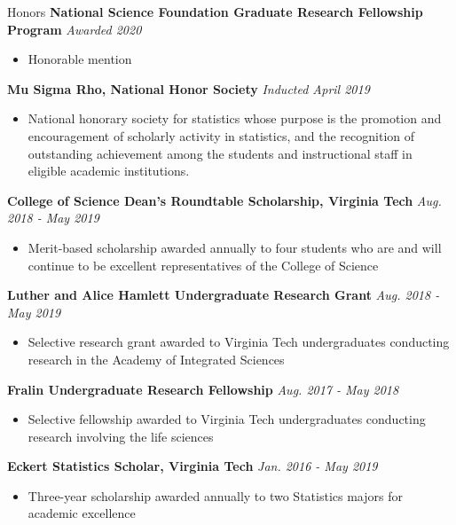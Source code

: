 \documentclass{resume} %
\begin{document}
\newpage

\begin{rSection}{Honors}
{\bf National Science Foundation Graduate Research Fellowship Program} \hfill { \em Awarded 2020}
\begin{itemize}
    \item Honorable mention
\end{itemize}

{\bf Mu Sigma Rho, National Honor Society} \hfill { \em Inducted April 2019}
\begin{itemize}
    \item National honorary society for statistics whose purpose is the promotion and encouragement of scholarly activity in statistics, and the recognition of outstanding achievement among the students and instructional staff in eligible academic institutions.
\end{itemize}

{\bf College of Science Dean’s Roundtable Scholarship, Virginia Tech} \hfill { \em Aug. 2018 - May 2019}
\begin{itemize}
    \item Merit-based scholarship awarded annually to four students who are and will continue to be excellent representatives of the College of Science
\end{itemize}

{\bf Luther and Alice Hamlett Undergraduate Research Grant} \hfill { \em Aug. 2018 - May 2019}
\begin{itemize}
    \item Selective research grant awarded to Virginia Tech undergraduates conducting research in the Academy of Integrated Sciences
\end{itemize}

{\bf Fralin Undergraduate Research Fellowship} \hfill { \em Aug. 2017 - May 2018}
\begin{itemize}
    \item Selective fellowship awarded to Virginia Tech undergraduates conducting research involving the life sciences
\end{itemize}

{\bf Eckert Statistics Scholar, Virginia Tech} \hfill { \em Jan. 2016 - May 2019}
\begin{itemize}
    \item Three-year scholarship awarded annually to two Statistics majors for academic excellence
\end{itemize}

\end{rSection}
\end{document}
